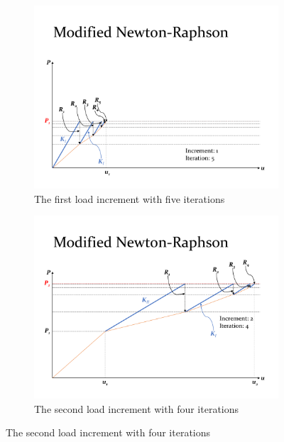 \documentclass{article}
\begin{document}
\begin{figure}[ht]
    \centering
        \begin{subfigure}{0.64\textwidth}
            \includegraphics[width=1\linewidth]{figures/mnr1.pdf} 
            \caption{The first load increment with five iterations}
            \label{fig:mnr1}
        \end{subfigure}
        
        \begin{subfigure}{0.64\textwidth}
            \includegraphics[width=1\linewidth]{figures/mnr2.pdf} 
            \caption{The second load increment with four iterations}
            \label{fig:mnr2}
        \end{subfigure}
        

\end{figure}
\end{document}
